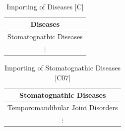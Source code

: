 \begin{minipage}{0.45\textwidth}
  \begin{table}[H]
    \centering
    \caption{Importing of Diseases [C]}
    \label{t:json-to-csv-1}
  \begin{center}
    \begin{tabular}{c}
     Diseases \\
     \hline
     Stomatognathic Diseases \\
     $\vdots$ \\
    \end{tabular}
  \end{center}
\end{table}
\end{minipage}
\begin{minipage}{0.45\textwidth}
  \begin{table}[H]
    \centering
    \caption{Importing of Stomatognathic Diseases [C07]}
    \label{t:json-to-csv-2}
  \begin{center}
    \begin{tabular}{c}
     Stomatognathic Diseases \\
     \hline
     Temporomandibular Joint Disorders \\
     $\vdots$ \\
    \end{tabular}
  \end{center}
\end{table}
\end{minipage}


